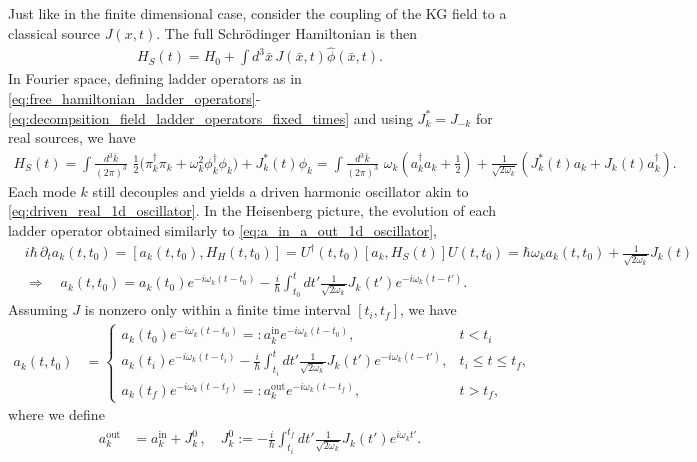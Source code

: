 \documentclass[../QFT_main.tex]{subfiles}
\begin{document}
\begin{mytheorem}
%
Just like in the finite dimensional case, consider the coupling of the KG field to a classical source $J(x,t)$.
The full Schrödinger Hamiltonian is then
\begin{align}
    H_S(t) = H_0 + \int d^3\bar{x}\, J(\bar{x},t) \hat{\phi}(\bar{x},t).
\end{align}
In Fourier space, defining ladder operators as in \eqref{eq:free_hamiltonian_ladder_operators}-\eqref{eq:decompsition_field_ladder_operators_fixed_times} and using $J^*_k=J_{-k}$ for real sources, we have
\begin{align}
    H_S(t) = \int \frac{d^3\bar{k}}{(2\pi)^3} \,\, \tfrac{1}{2}\Big(\pi_k^{\dagger} \pi_k + \omega_k^2 \phi_k^{\dagger} \phi_k \Big)+J_k^*(t)\phi_k
    = \int \frac{d^3\bar{k}}{(2\pi)^3} \,\,\omega_k \left( a_k^{\dagger} a_k + \tfrac{1}{2} \right) + \frac{1}{\sqrt{2\omega_k}} \left( J_k^*(t) a_k + J_k(t) a_k^{\dagger} \right).
\end{align}
Each mode $k$ still decouples and yields a driven harmonic oscillator akin to \eqref{eq:driven_real_1d_oscillator}.
In the Heisenberg picture, the evolution of each ladder operator obtained similarly to \eqref{eq:a_in_a_out_1d_oscillator},
\begin{align}
    &i\hbar\,\partial_t a_k(t,t_0)= [a_k(t,t_0), H_H(t,t_0)] = U^\dagger(t,t_0)[a_k,H_S(t)]U(t,t_0)= \hbar \omega_k a_k(t,t_0) + \frac{1}{\sqrt{2 \omega_k}} J_k(t) \\
    &\Rightarrow \quad a_k(t,t_0) = a_k(t_0) e^{-i\omega_k (t-t_0)} - \frac{i}{\hbar} \int_{t_0}^t dt' \frac{1}{\sqrt{2 \omega_k}} J_k(t')  e^{-i\omega_k (t-t')}.
\end{align}
Assuming $J$ is nonzero only within a finite time interval $[t_i, t_f]$, we have
\begin{align}\label{eq:a_in_a_out_field_oscillator}
    a_k(t,t_0) &= \begin{cases}
        a_k(t_0) e^{-i\omega_k (t-t_0)}=: a_k^{\mathrm{in}}e^{-i\omega_k (t-t_0)}, & t < t_i\,\\[6pt]
        a_k(t_i) e^{-i\omega_k (t-t_i)} - \frac{i}{\hbar} \int_{t_i}^t dt' \frac{1}{\sqrt{2 \omega_k}} J_k(t') e^{-i\omega_k (t-t')}, & t_i \leq t \leq t_f,\\[6pt]
        a_k(t_f) e^{-i\omega_k (t-t_f)}=: a_k^{\mathrm{out}} e^{-i\omega_k (t-t_f)}, & t > t_f,
    \end{cases}
\end{align}
where we define
\begin{align}
    a_k^{\mathrm{out}} &= a_k^{\mathrm{in}} + J_k^{0}\,,\quad J_k^{0} := - \frac{i}{\hbar} \int_{t_i}^{t_f} dt' \frac{1}{\sqrt{2 \omega_k}} J_k(t') e^{i\omega_k t'}.
\end{align}


\end{mytheorem}
\end{document}
